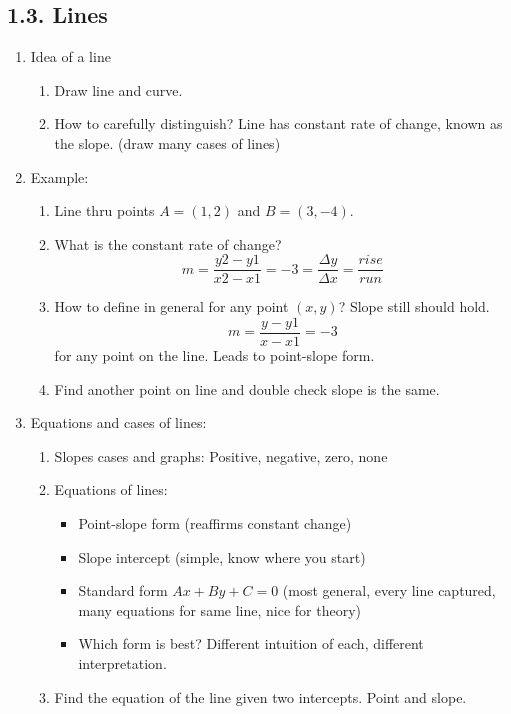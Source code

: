 \documentclass{article}
\begin{document}
\subsection{1.3. Lines}

\begin{enumerate}
\item Idea of a line
\begin{enumerate}
\item Draw line and curve. 
\item How to carefully distinguish? Line has constant rate of change, known as the slope. (draw many cases of lines)
\end{enumerate}


\item Example:
\begin{enumerate}
\item Line thru points $A=(1,2)$ and $B=(3,-4)$. 
\item What is the constant rate of change?
\[
m = \frac{y2-y1}{x2-x1}= -3= \frac{\Delta y}{\Delta x} = \frac{rise}{run}
\]
\item How to define in general for any point $(x,y)$? Slope still should hold.
\[
m = \frac{y-y1}{x-x1}= -3
\]
for any point on the line. Leads to point-slope form.
\item Find another point on line and double check slope is the same.
\end{enumerate}

\item Equations and cases of lines:
\begin{enumerate}
\item Slopes cases and graphs: Positive, negative, zero, none
\item Equations of lines:
\begin{itemize}
\item Point-slope form (reaffirms constant change)
\item Slope intercept (simple, know where you start)
\item Standard form $Ax+By+C=0$ (most general, every line captured, many equations for same line, nice for theory)
\item Which form is best? Different intuition of each, different interpretation.
\end{itemize}
\item Find the equation of the line given two intercepts. Point and slope.
\end{enumerate}


\end{enumerate}
\end{document}
